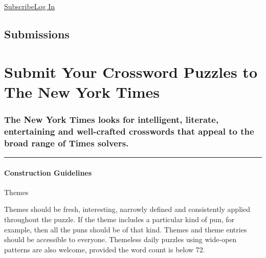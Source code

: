 \href{https://www.nytimes.com/subscription/games?campaignId=4QHQ8}{Subscribe}\href{https://myaccount.nytimes.com/auth/login?redirect_uri=https\%3A\%2F\%2Fwww.nytimes.com\%2Fpuzzles\%2Fsubmissions\%2Fcrossword\&response_type=cookie\&client_id=games\&application=crosswords\&asset=navigation-bar}{Log
In}

\hypertarget{submissions}{%
\subsection{Submissions}\label{submissions}}

\hypertarget{submit-your-crossword-puzzles-to-the-new-york-times}{%
\section{Submit Your Crossword Puzzles to The New York
Times}\label{submit-your-crossword-puzzles-to-the-new-york-times}}

\hypertarget{the-new-york-times-looks-for-intelligent-literate-entertaining-and-well-crafted-crosswords-that-appeal-to-the-broad-range-of-times-solvers}{%
\subsubsection{The New York Times looks for intelligent, literate,
entertaining and well-crafted crosswords that appeal to the broad range
of Times
solvers.}\label{the-new-york-times-looks-for-intelligent-literate-entertaining-and-well-crafted-crosswords-that-appeal-to-the-broad-range-of-times-solvers}}

\begin{center}\rule{0.5\linewidth}{\linethickness}\end{center}

\hypertarget{construction-guidelines}{%
\paragraph{Construction Guidelines}\label{construction-guidelines}}

Themes

Themes should be fresh, interesting, narrowly defined and consistently
applied throughout the puzzle. If the theme includes a particular kind
of pun, for example, then all the puns should be of that kind. Themes
and theme entries should be accessible to everyone. Themeless daily
puzzles using wide-open patterns are also welcome, provided the word
count is below 72.

